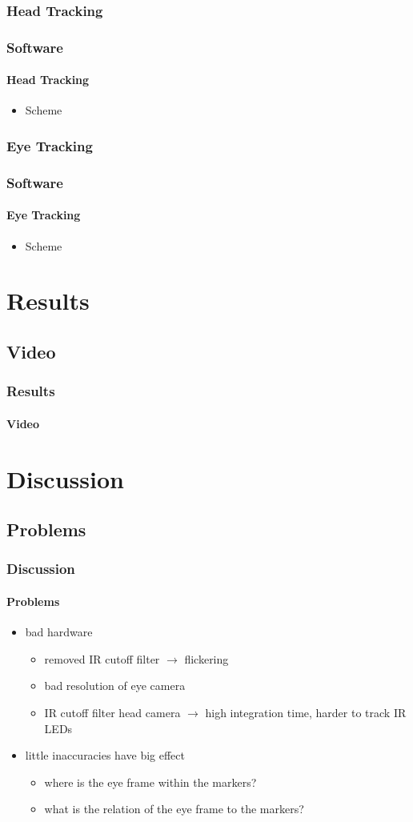\documentclass[%
14pt
]{beamer}
\begin{document}
\subsubsection{Head Tracking}
\begin{frame}
	\frametitle{Software}
  \framesubtitle{Head Tracking}
  \begin{itemize}
    \item Scheme
  \end{itemize}
\end{frame}
\subsubsection{Eye Tracking}
\begin{frame}
	\frametitle{Software}
  \framesubtitle{Eye Tracking}
  \begin{itemize}
    \item Scheme
  \end{itemize}
\end{frame}


\section{Results}
\subsection{Video}
\begin{frame}
	\frametitle{Results}
  \framesubtitle{Video}
\end{frame}

\section{Discussion}
\subsection{Problems}
\begin{frame}
	\frametitle{Discussion}
  \framesubtitle{Problems}
  \begin{itemize}
    \item bad hardware
      \begin{itemize}
        \item removed IR cutoff filter $\rightarrow$ flickering
        \item bad resolution of eye camera
        \item IR cutoff filter head camera $\rightarrow$ high integration time, harder to track IR LEDs
      \end{itemize}
    \item little inaccuracies have big effect
      \begin{itemize}
        \item where is the eye frame within the markers?
        \item what is the relation of the eye frame to the markers?
      \end{itemize}
  \end{itemize}
\end{frame}
\end{document}
